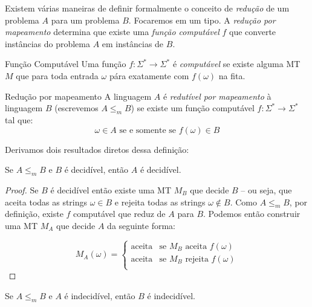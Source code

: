 Existem várias maneiras de definir formalmente o conceito de {\em redução} de um problema $A$ para um problema $B$.
Focaremos em um tipo.
A {\em redução por mapeamento} determina que existe uma {\em função computável} $f$ que converte instâncias do problema $A$ em instâncias de $B$.

\begin{definition}{Função Computável}
  Uma função $f: \Sigma^* \to \Sigma^*$ é {\em computável} se existe alguma MT $M$ que para toda entrada $\omega$ pára exatamente com $f(\omega)$ na fita.
\end{definition}

\begin{definition}{Redução por mapeamento}
  A linguagem $A$ é {\em redutível por mapeamento} à linguagem $B$ (escrevemos $A \leq_m B$) se existe um função computável $f : \Sigma^* \to \Sigma^*$ tal que:
  \begin{displaymath}
    \omega \in A \textrm{ se e somente se } f(\omega) \in B
  \end{displaymath}
\end{definition}

Derivamos dois resultados diretos dessa definição:

\begin{corollary}
  Se $A \leq_m B$ e $B$ é decidível, então $A$ é decidível.
\end{corollary}
\begin{proof}
  Se $B$ é decidível então existe uma MT $M_B$ que decide $B$ -- ou seja, que aceita todas as strings $\omega \in B$ e rejeita todas as strings $\omega \notin B$.
  Como $A \leq_m B$, por definição, existe $f$ computável que reduz de $A$ para $B$.
  Podemos então construir uma MT $M_A$ que decide $A$ da seguinte forma:

 \begin{displaymath}
    M_A(\omega) = \left\{\begin{array}{cl}
                 \textrm{aceita} & \textrm{se $M_B$ aceita $f(\omega)$}\\
                 \textrm{aceita} & \textrm{se $M_B$ rejeita $f(\omega)$}\\ 
               \end{array}\right.
  \end{displaymath}  
\end{proof}

\begin{corollary}
  Se $A \leq_m B$ e $A$ é indecidível, então $B$ é indecidível.
\end{corollary}

